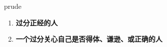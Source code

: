 
\begin{frame}
{\huge prude}
\begin{center}
\begin{enumerate}\Large
  \item \textbf{过分正经的人}
  \item \textbf{一个过分关心自己是否得体、谦逊、或正确的人}
\end{enumerate}
\end{center}
\end{frame}
